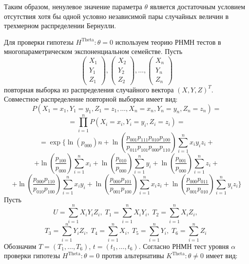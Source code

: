     Таким образом, ненулевое значение параметра
    $\theta$ является достаточным условием отсутствия хотя бы одной
    условно независимой пары
    случайных величин в трехмерном распределении Бернулли.
    
    Для проверки гипотезы $H^{\text{Theta}}:\theta=0$ используем 
    теорию РНМН тестов \cite{Lehmann1986} в многопараметрическом 
    экспоненциальном семействе. Пусть
    $$
        \begin{pmatrix}
            X_1 \\
            Y_1 \\
            Z_1
        \end{pmatrix},
        \begin{pmatrix}
            X_2 \\
            Y_2 \\
            Z_2
        \end{pmatrix}, \ldots,
        \begin{pmatrix}
            X_n \\
            Y_n \\
            Z_n
        \end{pmatrix}
    $$ повторная выборка из распределения случайного вектора $(X,Y,Z)^T$.
    Совместное распределение повторной выборки имеет вид:
    $$
    P(X_1=x_1,Y_1=y_1,Z_1=z_1,\ldots,X_n=x_n,Y_n=y_n,Z_n=z_n)=
    $$
    $$
    =\prod_{i=1}^n P(X_i=x_i,Y_i=y_i,Z_i=z_i) =
    $$
    $$
     =\exp \Biggl\{\ln(p_{000})n + \ln  \left(\dfrac{p_{001}p_{111}p_{010}p_{100}}{p_{011}p_{101}p_{000}p_{110}}\right) \sum_{i=1}^n x_i y_i z_i +
     $$
        $$ +
            \ln\left(\dfrac{p_{100}}{p_{000}}\right) \sum_{i=1}^{n} x_i + \ln\left(\dfrac{p_{010}}{p_{000}}\right) \sum_{i=1}^{n} y_i +
            \ln\left(\dfrac{p_{001}}{p_{000}}\right) \sum_{i=1}^{n} z_i +
        $$
        $$
            +\ln \left(\dfrac{p_{000}p_{110}}{p_{010}p_{100}}\right) \sum_{i=1}^n x_i y_i +
            \ln \left(\dfrac{p_{000}p_{101}}{p_{001}p_{100}}\right) \sum_{i=1}^n x_i z_i +
            \ln \left(\dfrac{p_{000}p_{011}}{p_{001}p_{010}}\right) \sum_{i=1}^n y_i z_i \Biggr\}
        $$
    Пусть 
    $$
        U = \sum_{i=1}^n X_i Y_i Z_i, \;
        T_1 = \sum_{i=1}^n X_i Y_i, \;
        T_2 = \sum_{i=1}^n X_i Z_i, \;
    $$
    $$
        T_3 = \sum_{i=1}^n Y_i Z_i, \;
        T_4 = \sum_{i=1}^n X_i, \;
        T_5 = \sum_{i=1}^n Y_i, \;
        T_6 = \sum_{i=1}^n Z_i \;
    $$
    Обозначим $T=(T_1,\ldots,T_6)$, $t=(t_1,\ldots,t_6)$.
    Согласно \cite{Lehmann1986} РНМН тест уровня $\alpha$ проверки гипотезы $H^{\text{Theta}}:\theta=0$ против альтернативы $K^{\text{Theta}}:\theta \neq 0$ имеет вид:
